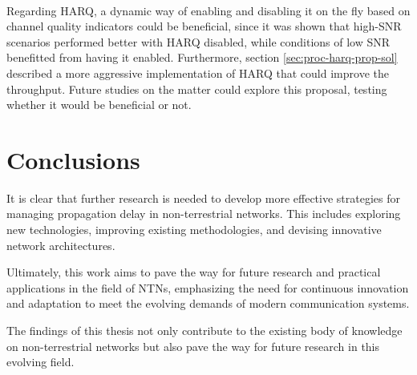 \paragraph{}
Regarding \ac{HARQ}, a dynamic way of enabling and disabling it on the fly based on channel quality indicators could be beneficial, since it was shown that high-\ac{SNR} scenarios performed better with \ac{HARQ} disabled, while conditions of low \ac{SNR} benefitted from having it enabled. Furthermore, section \ref{sec:proc-harq-prop-sol} described a more aggressive implementation of \ac{HARQ} that could improve the throughput. Future studies on the matter could explore this proposal, testing whether it would be beneficial or not.


\section{Conclusions}
It is clear that further research is needed to develop more effective strategies for managing propagation delay in non-terrestrial networks. This includes exploring new technologies, improving existing methodologies, and devising innovative network architectures.

Ultimately, this work aims to pave the way for future research and practical applications in the field of \ac{NTN}s, emphasizing the need for continuous innovation and adaptation to meet the evolving demands of modern communication systems. 

The findings of this thesis not only contribute to the existing body of knowledge on non-terrestrial networks but also pave the way for future research in this evolving field.
